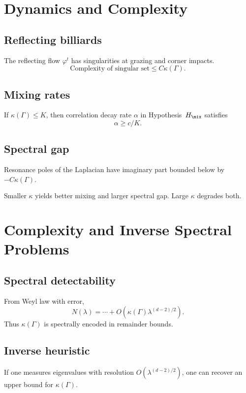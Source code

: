 \section{Dynamics and Complexity}
\label{sec:dynamics-complexity}

\subsection{Reflecting billiards}
The reflecting flow $\varphi^t$ has singularities at grazing and corner impacts.
\[
\text{Complexity of singular set} \le C\kappa(\Gamma).
\]

\subsection{Mixing rates}
If $\kappa(\Gamma)\le K$, then correlation decay rate $\alpha$ in Hypothesis~$H_{\mix}$ satisfies
\[
\alpha\ge c/K.
\]

\subsection{Spectral gap}
Resonance poles of the Laplacian have imaginary part bounded below by $-C\kappa(\Gamma)$.

\begin{remark}
Smaller $\kappa$ yields better mixing and larger spectral gap. Large $\kappa$ degrades both.
\end{remark}

\section{Complexity and Inverse Spectral Problems}
\label{sec:inverse}

\subsection{Spectral detectability}
From Weyl law with error,
\[
N(\lambda)=\cdots+O(\kappa(\Gamma)\lambda^{(d-2)/2}).
\]
Thus $\kappa(\Gamma)$ is spectrally encoded in remainder bounds.

\subsection{Inverse heuristic}
If one measures eigenvalues with resolution $O(\lambda^{(d-2)/2})$, one can recover an upper bound for $\kappa(\Gamma)$.

